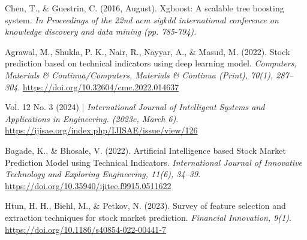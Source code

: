 \documentclass{ieeeojies}
\begin{document}
\begin{thebibliography}{00}
     Chen, T., \& Guestrin, C. (2016, August). Xgboost: A scalable tree boosting system. \textit{In Proceedings of the 22nd acm sigkdd international conference on knowledge discovery and data mining (pp. 785-794).}

     Agrawal, M., Shukla, P. K., Nair, R., Nayyar, A., \& Masud, M. (2022). Stock prediction based on technical indicators using deep learning model. \textit{Computers, Materials \& Continua/Computers, Materials \& Continua (Print), 70(1), 287–304}. \url{https://doi.org/10.32604/cmc.2022.014637}

     Vol. 12 No. 3 (2024) | \textit{International Journal of Intelligent Systems and Applications in Engineering. (2023c, March 6)}. \url{https://ijisae.org/index.php/IJISAE/issue/view/126}

     Bagade, K., \& Bhosale, V. (2022). Artificial Intelligence based Stock Market Prediction Model using Technical Indicators. \textit{International Journal of Innovative Technology and Exploring Engineering, 11(6), 34–39}. \url{https://doi.org/10.35940/ijitee.f9915.0511622}

     Htun, H. H., Biehl, M., \& Petkov, N. (2023). Survey of feature selection and extraction techniques for stock market prediction. \textit{Financial Innovation, 9(1)}. \url{https://doi.org/10.1186/s40854-022-00441-7}



\end{thebibliography}

\EOD
\end{document}
